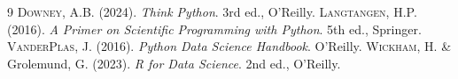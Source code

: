 \documentclass[12pt,a4paper,twoside]{book}
\theoremstyle{definition}
\theoremstyle{remark}
\begin{document}
\begin{thebibliography}{9}
 \textsc{Downey}, A.B. (2024). \emph{Think Python}. 3rd ed., O'Reilly.
 \textsc{Langtangen}, H.P. (2016). \emph{A Primer on Scientific Programming with Python}. 5th ed., Springer.
 \textsc{VanderPlas}, J. (2016). \emph{Python Data Science Handbook}. O'Reilly.
 \textsc{Wickham}, H. \& Grolemund, G. (2023). \emph{R for Data Science}. 2nd ed., O'Reilly.
\end{thebibliography}

\printindex
\end{document}
